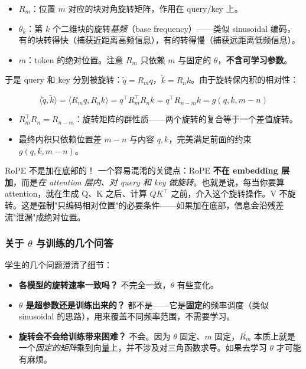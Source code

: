 \documentclass[a4paper]{article}
\begin{document}
\begin{itemize}
    \item $R_m$：位置 $m$ 对应的块对角旋转矩阵，作用在 query/key 上。
    \item $\theta_k$：第 $k$ 个二维块的旋转\emph{基频}（base frequency）——类似 sinusoidal 编码，有的块转得快（捕获近距离高频信息），有的转得慢（捕获远距离低频信息）。
    \item $m$：token 的绝对位置。注意 $R_m$ 只依赖 $m$ 与固定的 $\theta$，\textbf{不含可学习参数}。
\end{itemize}

于是 query 和 key 分别被旋转：$\tilde q = R_m q$，$\tilde k = R_n k$。由于旋转保内积的相对性：

\[
\langle \tilde q, \tilde k \rangle = \langle R_m q, R_n k \rangle = q^\top R_m^\top R_n k = q^\top R_{n-m} k = g(q, k, m-n)
\]

\begin{itemize}
    \item $R_m^\top R_n = R_{n-m}$：旋转矩阵的群性质——两个旋转的复合等于一个差值旋转。
    \item 最终内积只依赖位置差 $m-n$ 与内容 $q, k$，完美满足前面的约束 $g(q,k,m-n)$。
\end{itemize}

\begin{warningbox}{RoPE 不是加在底部的！}
一个容易混淆的关键点：RoPE \textbf{不在 embedding 层加}，而是\emph{在 attention 层内、对 query 和 key 做旋转}。也就是说，每当你要算 attention，就在生成 Q、K 之后、计算 $QK^\top$ 之前，介入这个旋转操作。V 不旋转。这是强制"只编码相对位置"的必要条件——如果加在底部，信息会沿残差流"泄漏"成绝对位置。
\end{warningbox}

\subsubsection{关于 $\theta$ 与训练的几个问答}

学生的几个问题澄清了细节：

\begin{itemize}
    \item \textbf{各模型的旋转速率一致吗？} 不完全一致，$\theta$ 有些变化。
    \item \textbf{$\theta$ 是超参数还是训练出来的？} 都不是——它是\textbf{固定}的频率调度（类似 sinusoidal 的思路），用来覆盖不同频率范围，不需要学习。
    \item \textbf{旋转会不会给训练带来困难？} 不会。因为 $\theta$ 固定、$m$ 固定，$R_m$ 本质上就是一个\emph{固定的矩阵}乘到向量上，并不涉及对三角函数求导。如果去学习 $\theta$ 才可能有麻烦。
\end{itemize}
\end{document}
